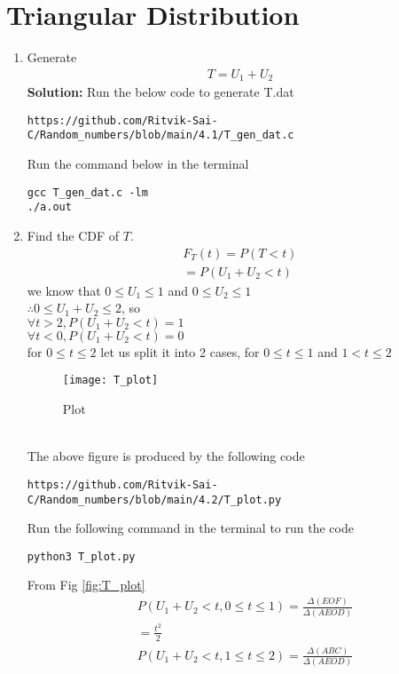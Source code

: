 \documentclass[journal,12pt,twocolumn]{IEEEtran}
\renewcommand\thesection{\arabic{section}}
\theoremstyle{remark}
\newcommand{\solution}{\noindent \textbf{Solution: }}
\numberwithin{equation}{section}
\begin{document}
\section{Triangular Distribution}
\begin{enumerate}[label=\thesection.\arabic*
,ref=\thesection.\theenumi]
%
\item Generate 
	\begin{align}
		T = U_1+U_2
	\end{align}
\solution 
Run the below code to generate T.dat
\begin{lstlisting}
https://github.com/Ritvik-Sai-C/Random_numbers/blob/main/4.1/T_gen_dat.c
\end{lstlisting}
Run the command below in the terminal 
\begin{lstlisting}
gcc T_gen_dat.c -lm
./a.out
\end{lstlisting}
\item Find the CDF of $T$.
\begin{align}
F_{T}(t)=P(T<t)
\\=P(U_1 +U_2 <t)
\end{align}
we know that $0\leq U_1 \leq 1$ and $0\leq U_2 \leq 1$\\
$\therefore 0\leq U_1 + U_2 \leq 2$, so\\
 $\forall t>2, P(U_1 +U_2 <t)=1$\\
 $\forall t<0, P(U_1 +U_2 <t)=0$\\
   for $0\leq t \leq 2$ let us split it into 2 cases, for $0 \leq t\leq 1$ and $1 <t \leq2$\\
    \begin{figure}[h]
\texttt{[image: T\_plot]}
\caption{Plot}
\label{fig:T_plot}
\end{figure}
\\
The above figure is produced by the following code
\begin{lstlisting}
https://github.com/Ritvik-Sai-C/Random_numbers/blob/main/4.2/T_plot.py
\end{lstlisting}
Run the following command in the terminal to run the code
\begin{lstlisting}
python3 T_plot.py
\end{lstlisting}
From Fig \eqref{fig:T_plot}
\begin{align}
&P(U_1+U_2<t, 0\leq t \leq 1)=\frac{ \Delta(EOF)}{\Delta(AEOD)}\\
&=\frac{t^2}{2}\\
&P(U_1+U_2<t, 1\leq t \leq 2)=\frac{\Delta(ABC)}{\Delta(AEOD)}\\

\end{align}
\end{enumerate}
\end{document}
